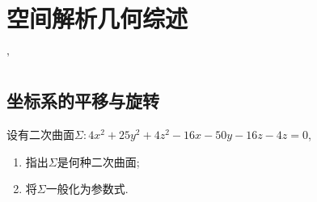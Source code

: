 \chapter{空间解析几何综述}'

\section{坐标系的平移与旋转}

\begin{example}
    设有二次曲面$\Sigma:4x^2+25y^2+4z^2-16x-50y-16z-4z=0$,

    \begin{enumerate}
        \item 指出$\Sigma$是何种二次曲面;
        \item 将$\Sigma$一般化为参数式.
    \end{enumerate}
\end{example}\


